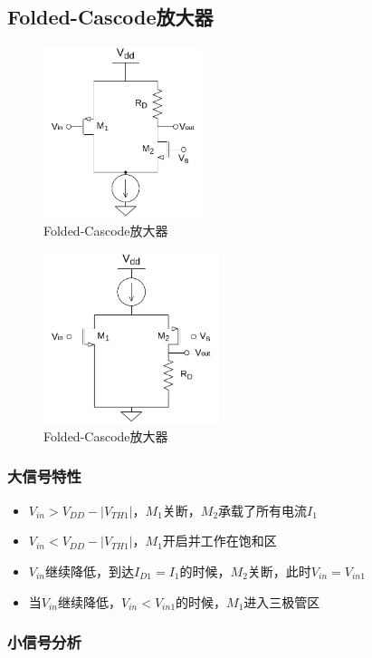 \documentclass[twoside,a4paper,openright,titlepage,draft]{ctexrep}
\begin{document}
\subsection{Folded-Cascode放大器}
\begin{multicols}{2}
    \begin{figure}[H]
        \centering
        \includegraphics[height=50mm]{foldedcascode.drawio.pdf}
        \caption{Folded-Cascode放大器}
        \label{fig:foldedcascode}
    \end{figure}
    \columnbreak
    \begin{figure}[H]
        \centering
        \includegraphics[height=50mm]{foldedcascode2.drawio.pdf}
        \caption{Folded-Cascode放大器}
        \label{fig:foldedcascode}
    \end{figure}
\end{multicols}
\subsubsection{大信号特性}
\begin{itemize}
    \item $V_{in}>V_{DD}-|V_{TH1}|$，$M_1$关断，$M_2$承载了所有电流$I_1$
    \item $V_{in}<V_{DD}-|V_{TH1}|$，$M_1$开启并工作在饱和区
    \item $V_{in}$继续降低，到达$I_{D1}=I_1$的时候，$M_2$关断，此时$V_{in}=V_{in1}$
    \item 当$V_{in}$继续降低，$V_{in}<V_{in1}$的时候，$M_1$进入三极管区
\end{itemize}
\subsubsection{小信号分析}
\end{document}
